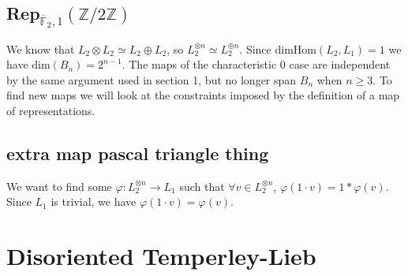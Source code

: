 \documentclass[11pt]{article} %
\begin{document}
\subsection{Rep$_{\overline{\mathbb{F}}_2,1}(\mathbb{Z}/2\mathbb{Z})$}
We know that $L_2 \otimes L_2 \simeq L_2 \oplus L_2$, so $L_2^{\otimes n} \simeq L_2^{\oplus n}$. Since dimHom$(L_2,L_1)=1$ we have dim$(B_n) = 2^{n-1}$. The maps of the characteristic $0$ case are independent by the same argument used in section 1, but no longer span $B_n$ when $n \geq 3$. To find new maps we will look at the constraints imposed by the definition of a map of representations. 

\subsection{extra map pascal triangle thing}

We want to find some $\varphi:L_2^{\otimes n} \rightarrow L_1$ such that $\forall v \in L_2^{\otimes n}$, $\varphi(1 \cdot v) = 1 \ast \varphi(v)$. Since $L_1$ is trivial, we have $\varphi(1 \cdot v) = \varphi(v)$.




\section{Disoriented Temperley-Lieb}


\fi
\end{document}
